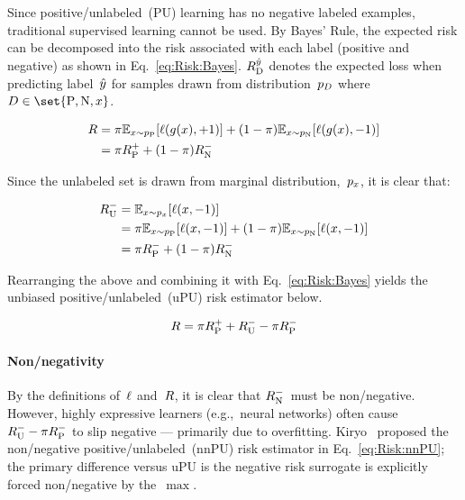 Since positive\-/unlabeled~(PU) learning has no negative labeled examples, traditional supervised learning cannot be used. By Bayes' Rule, the expected risk can be decomposed into the risk associated with each label (positive and negative) as shown in Eq.~\eqref{eq:Risk:Bayes}.  ${R_{\textnormal{D}}^{\hat{y}}}$ denotes the expected loss when predicting label~$\hat{y}$ for samples drawn from distribution~${p_{D}}$ where ${D \in \set{\textnormal{P}, \textnormal{N}, \X}}$.

\begin{align}
  R &= \pi \mathbb{E}_{x \sim p_{\textnormal{P}}}\lbrack\ell\mathopen{}\left(g\mathopen{}\left(x\right)\mathclose{},{+}1\right)\mathclose{}\rbrack + (1-\pi) \mathbb{E}_{x \sim p_{\textnormal{N}}}\lbrack\ell\mathopen{}\left(g\mathopen{}\left(x\right)\mathclose{},{-}1\right)\mathclose{}\rbrack \nonumber \\
        &= \pi R_{\textnormal{P}}^{{+}} + (1-\pi) R_{\textnormal{N}}^{{-}} \label{eq:Risk:Bayes}
\end{align}

Since the unlabeled set is drawn from marginal distribution,~$p_{x}$, it is clear that:

\begin{align}
  R_{\textnormal{U}}^{{-}} &= \mathbb{E}_{x \sim p_{x}} \lbrack\ell\mathopen{}\left(x,{-}1\right)\mathclose{}\rbrack \nonumber \\
            &= \pi \mathbb{E}_{x \sim p_{\textnormal{P}}} \lbrack\ell\mathopen{}\left(x,{-}1\right)\mathclose{}\rbrack + (1 - \pi) \mathbb{E}_{x \sim p_{\textnormal{N}}} \lbrack\ell\mathopen{}\left(x,{-}1\right)\mathclose{}\rbrack\nonumber \\
            &= \pi R_{\textnormal{P}}^{{-}} + (1 - \pi) R_{\textnormal{N}}^{{-}} \label{eq:Risk:Unlabeled}
\end{align}

\noindent
Rearranging the above and combining it with Eq.~\eqref{eq:Risk:Bayes} yields the unbiased positive\-/unlabeled~(uPU) risk estimator below.~\cite{duPlessis:2014}

\begin{equation}\label{eq:Risk:uPU}
  R = \pi R_{\textnormal{P}}^{{+}} + R_{\textnormal{U}}^{{-}} - \pi R_{\textnormal{P}}^{{-}}
\end{equation}

\paragraph{Non\-/negativity} By the definitions of~$\ell$ and~$R$, it is clear that $R_{\textnormal{N}}^{{-}}$~must be non\-/negative.  However, highly expressive learners (e.g.,~neural networks) often cause ${R_{\textnormal{U}}^{{-}} - \pi R_{\textnormal{P}}^{{-}}}$ to slip negative --- primarily due to overfitting.  Kiryo\etal~\cite{Kiryo:2017} proposed the non\-/negative positive\-/unlabeled~(nnPU) risk estimator in Eq.~\eqref{eq:Risk:nnPU}; the primary difference versus uPU is the negative risk surrogate is explicitly forced non\-/negative by the~$\max$.

